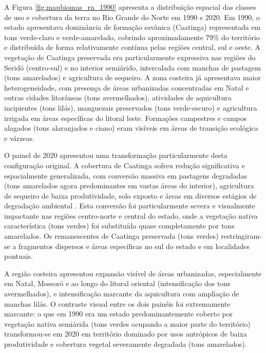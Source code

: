 A Figura \ref{fig:mapbiomas_rn_1990} apresenta a distribuição espacial das classes de uso e cobertura da terra no Rio Grande do Norte em 1990 e 2020. Em 1990, o estado apresentava dominância de formação savânica (Caatinga) representada em tons verde-claro e verde-amarelado, cobrindo aproximadamente 79\% do território e distribuída de forma relativamente contínua pelas regiões central, sul e oeste. A vegetação de Caatinga preservada era particularmente expressiva nas regiões do Seridó (centro-sul) e no interior semiárido, intercalada com manchas de pastagem (tons amarelados) e agricultura de sequeiro. A zona costeira já apresentava maior heterogeneidade, com presença de áreas urbanizadas concentradas em Natal e outras cidades litorâneas (tons avermelhados), atividades de aquicultura incipientes (tons lilás), manguezais preservados (tons verde-escuro) e agricultura irrigada em áreas específicas do litoral leste. Formações campestres e campos alagados (tons alaranjados e ciano) eram visíveis em áreas de transição ecológica e várzeas.

O painel de 2020 apresentou uma transformação particularmente desta configuração original. A cobertura de Caatinga sofreu redução significativa e espacialmente generalizada, com conversão massiva em pastagens degradadas (tons amarelados agora predominantes em vastas áreas do interior), agricultura de sequeiro de baixa produtividade, solo exposto e áreas em diversos estágios de degradação ambiental \citep{santos2014caatinga, sudene2024desertificacao}. Esta conversão foi particularmente severa e visualmente impactante nas regiões centro-norte e central do estado, onde a vegetação nativa característica (tons verdes) foi substituída quase completamente por tons amarelados. Os remanescentes de Caatinga preservada (tons verdes) restringiram-se a fragmentos dispersos e áreas específicas no sul do estado e em localidades pontuais.

A região costeira apresentou expansão visível de áreas urbanizadas, especialmente em Natal, Mossoró e ao longo do litoral oriental (intensificação dos tons avermelhados), e intensificação marcante da aquicultura com ampliação de manchas lilás. O contraste visual entre os dois painéis foi extremamente marcante: o que em 1990 era um estado predominantemente coberto por vegetação nativa semiárida (tons verdes ocupando a maior parte do território) transformou-se em 2020 em território dominado por usos antrópicos de baixa produtividade e cobertura vegetal severamente degradada (tons amarelados).

